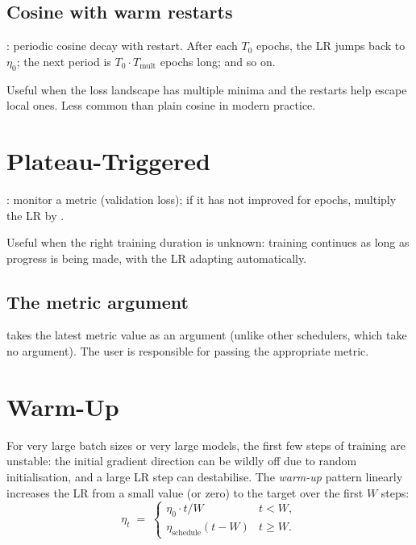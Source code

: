 \subsection{Cosine with warm restarts}
\label{ssec:lr_schedulers:cosine_warm_restart}

:
periodic cosine decay with restart. After each $T_0$ epochs, the
LR jumps back to $\eta_0$; the next period is $T_0 \cdot T_{\text{mult}}$
epochs long; and so on.

Useful when the loss landscape has multiple minima and the
restarts help escape local ones. Less common than plain cosine
in modern practice.

\section{Plateau-Triggered}
\label{sec:lr_schedulers:plateau}

:
monitor a metric (validation loss); if it has not improved for
 epochs, multiply the LR by .

Useful when the right training duration is unknown: training
continues as long as progress is being made, with the LR
adapting automatically.

\subsection{The metric argument}
\label{ssec:lr_schedulers:plateau_metric}

 takes the latest metric
value as an argument (unlike other schedulers, which take no
argument). The user is responsible for passing the appropriate
metric.

\section{Warm-Up}
\label{sec:lr_schedulers:warmup}

For very large batch sizes or very large models, the first few
steps of training are unstable: the initial gradient direction
can be wildly off due to random initialisation, and a large LR
step can destabilise. The \emph{warm-up} pattern linearly
increases the LR from a small value (or zero) to the target over
the first $W$ steps:
\[
\eta_t \;=\; \begin{cases}
\eta_0 \cdot t / W & t < W, \\
\eta_{\text{schedule}}(t - W) & t \geq W.
\end{cases}
\]

